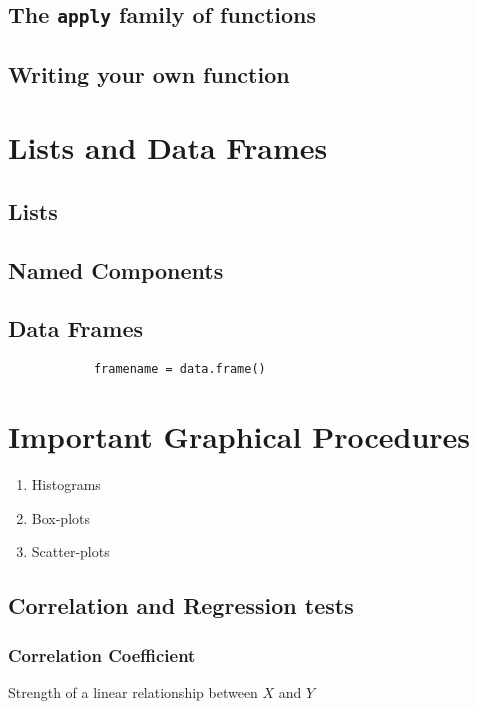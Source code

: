 \documentclass[a4paper,12pt]{article}
\begin{document}
\begin{itemize}
\begin{itemize}
		\subsection{The \texttt{apply} family of functions}
		\subsection{Writing your own function}
		
		
		\section{Lists and Data Frames}
		\subsection{Lists}
		\subsection{Named Components}
		\subsection{Data Frames}
		\begin{framed}
			\begin{verbatim}
			framename = data.frame()
			\end{verbatim}
		\end{framed}
		\section{Important Graphical Procedures}
		\begin{enumerate}
			\item Histograms
			\item Box-plots
			\item Scatter-plots
		\end{enumerate}
		
		
		
		\subsection{Correlation  and Regression tests }
		\subsubsection{Correlation Coefficient}
		Strength of a linear relationship between $X$ and $Y$
		

\end{itemize}
\end{itemize}
\end{document}
